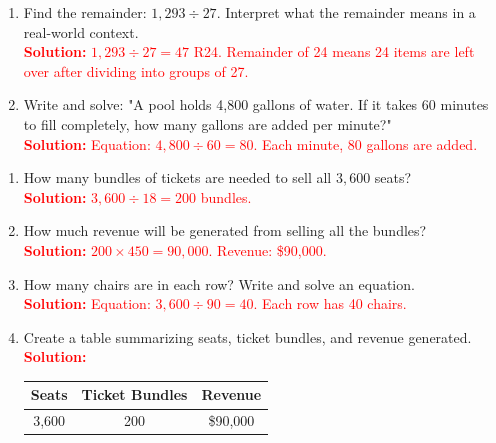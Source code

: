 \documentclass[12pt]{article}
\begin{document}
\begin{tcolorbox}[colframe=black!60, colback=white, 
coltitle=black, colbacktitle=black!15, fonttitle=\bfseries\Large, 
title=Problems, halign title=center, left=10pt, right=10pt, top=10pt, bottom=60pt]
\begin{enumerate}[start=9, itemsep=3em]
    \item Find the remainder: \( 1,293 \div 27 \). Interpret what the remainder means in a real-world context.\\
    \textcolor{red}{\textbf{Solution:} \( 1,293 \div 27 = 47 \) R24. Remainder of 24 means 24 items are left over after dividing into groups of 27.}

    \item Write and solve: "A pool holds 4,800 gallons of water. If it takes \( 60 \) minutes to fill completely, how many gallons are added per minute?"\\
    \textcolor{red}{\textbf{Solution:} Equation: \( 4,800 \div 60 = 80 \). Each minute, 80 gallons are added.}
\end{enumerate}
\end{tcolorbox}

\begin{tcolorbox}[colframe=black!60, colback=white, 
coltitle=black, colbacktitle=black!15, fonttitle=\bfseries\Large, 
title=Performance Task: Planning a Concert - Answer Key, halign title=center, left=10pt, right=10pt, top=10pt, bottom=50pt]
\begin{enumerate}[itemsep=3em]
    \item How many bundles of tickets are needed to sell all \( 3,600 \) seats?\\
    \textcolor{red}{\textbf{Solution:} \( 3,600 \div 18 = 200 \) bundles.}

    \item How much revenue will be generated from selling all the bundles?\\
    \textcolor{red}{\textbf{Solution:} \( 200 \times 450 = 90,000 \). Revenue: \$90,000.}

    \item How many chairs are in each row? Write and solve an equation.\\
    \textcolor{red}{\textbf{Solution:} Equation: \( 3,600 \div 90 = 40 \). Each row has 40 chairs.}

    \item Create a table summarizing seats, ticket bundles, and revenue generated.\\
    \textcolor{red}{\textbf{Solution:}}
    \begin{tabular}{|c|c|c|}
    \hline
    \textbf{Seats} & \textbf{Ticket Bundles} & \textbf{Revenue} \\
    \hline
    3,600          & 200                    & \$90,000         \\
    \hline
    \end{tabular}
\end{enumerate}
\end{tcolorbox}
\end{document}
